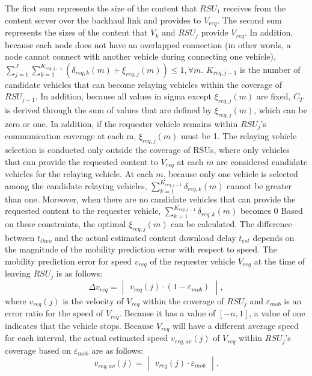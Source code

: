 \documentclass[electronics,aricle,accept,pdftex,moreauthors]{Definitions/mdpi}
\begin{document}
The first sum represents the size of the content that $RSU_{1}$ receives from the content server over the backhaul link and provides to $V_{req}$.
The second sum represents the sizes of the content that $V_{k}$ and $RSU_{j}$ provide $V_{req}$.
In addition, because each node does not have an overlapped connection (in other words, a node cannot connect with another vehicle during connecting one vehicle), $\sum_{j=1}^{J}\sum_{k=1}^{K_{req,j-1}}(\delta_{req, k}(m)+\xi_{req, j}(m))\leq 1, \forall{m}$. $K_{req,j-1}$ is the number of candidate vehicles that can become relaying vehicles within the coverage of $RSU_{j-1}$.
In addition, because all values in sigma except ${\xi}_{req, j}(m)$ are fixed, $C_{T}$ is derived through the sum of values that are defined by ${\xi}_{req, j}(m)$, which can be zero or one. In addition, if the requester vehicle remains within $RSU_{j}$’s communication coverage at each m, ${\xi}_{req, j}(m)$ must be 1.
The relaying vehicle selection is conducted only outside the coverage of RSUs, where only vehicles that can provide the requested content to $V_{req}$ at each $m$ are considered candidate vehicles for the relaying vehicle.
At each $m$, because only one vehicle is selected among the candidate relaying vehicles, $\sum_{k=1}^{K_{req,j-1}} \delta_{req, k}(m)$ cannot be greater than one.
Moreover, when there are no candidate vehicles that can provide the requested content to the requester vehicle, $\sum_{k=1}^{K_{req,j-1}} \delta_{req, k}(m)$ becomes 0
Based on these constraints, the optimal ${\xi}_{req, j}(m)$ can be calculated.
The difference between ${t}_{theo}$ and the actual estimated content download delay ${t}_{est}$ depends on the magnitude of the mobility prediction error with respect to speed. The mobility prediction error for speed $v_{req}$ of the requester vehicle $V_{req}$ at the time of leaving ${RSU}_{j}$ is as follows:
\begin{equation}
    \Delta v_{req} = \begin{vmatrix} v_{req}(j)\cdot(1-\varepsilon_{mob})\end{vmatrix},
\end{equation}
where $v_{req}(j)$ is the velocity of $V_{req}$ within the coverage of $RSU_{j}$ and $\varepsilon_{mob}$ is an error ratio for the speed of ${V}_{req}$. Because it has a value of $[-n, 1]$, a value of one indicates that the vehicle stops.
Because ${V}_{req}$ will have a different average speed for each interval, the actual estimated speed $v_{req, av}(j)$ of $V_{req}$ within $RSU_{j}$'s coverage based on $\varepsilon_{mob}$ are as follows:
\begin{equation}
    v_{req, av}(j) = \begin{vmatrix} v_{req}(j)\cdot\varepsilon_{mob}\end{vmatrix}.
\end{equation}
\end{document}
